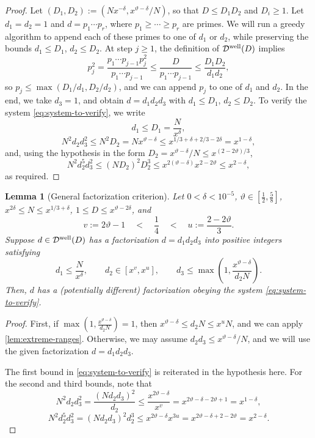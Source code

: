 \documentclass[reqno,11pt]{amsart}
\newtheorem{lemma}[theorem]{Lemma}
\theoremstyle{remark}
\numberwithin{equation}{section}
\newcommand{\mDw}{\mathcal{D}^{\textnormal{well}}}
\begin{document}
\begin{proof}
Let $(D_1, D_2) := (N x^{-\delta}, x^{\vartheta-\delta}/N)$, so that $D \le D_1 D_2$ and $D_i \ge 1$. Let $d_1 = d_2 = 1$ and $d = p_1\cdots p_r$, where $p_1 \ge \cdots \ge p_r$ are primes. We will run a greedy algorithm to append each of these primes to one of $d_1$ or $d_2$, while preserving the bounds $d_1 \le D_1$, $d_2 \le D_2$. At step $j \ge 1$, the definition of $\mDw(D)$ implies
\[
    p_j^2 = \frac{p_1\cdots p_{j-1} p_j^2}{p_1\cdots p_{j-1}} \le \frac{D}{p_1 \cdots p_{j-1}} \le \frac{D_1 D_2}{d_1 d_2},
\]
so $p_j \le \max(D_1/d_1, D_2/d_2)$, and we can append $p_j$ to one of $d_1$ and $d_2$. In the end, we take $d_3 = 1$, and obtain $d = d_1d_2d_3$ with $d_1 \le D_1$, $d_2 \le D_2$. To verify the system \cref{eq:system-to-verify}, we write
\[
    d_1 \le D_1 = \frac{N}{x^\delta},
\]
\[
    N^2 d_2 d_3^2 \le N^2 D_2 = N x^{\vartheta-\delta} \le x^{1/3+\delta+2/3-2\delta} = x^{1-\delta},
\]
and, using the hypothesis in the form $D_2 = x^{\vartheta-\delta}/N \le x^{(2-2\vartheta)/3}$,
\[
    N^2 d_2^5 d_3^2 \le (ND_2)^2 D_2^3 \le x^{2(\vartheta-\delta)} x^{2-2\vartheta} \le x^{2-\delta},
\]
as required.
\end{proof}

\begin{lemma}[General factorization criterion] \label{lem:general-factorization}
Let $0 < \delta < 10^{-5}$, $\vartheta \in [\tfrac{1}{2}, \tfrac{5}{8}]$, $x^{2\delta} \le N \le x^{1/3+\delta}$, $1 \le D \le x^{\vartheta-2\delta}$, and  
\begin{equation} \label{eq:u-v-choice}
    v := 2\vartheta - 1 \quad<\quad \frac{1}{4} \quad<\quad u := \frac{2-2\vartheta}{3}.
\end{equation}
Suppose $d \in \mDw(D)$ has a factorization $d = d_1d_2d_3$ into positive integers satisfying
\[
    d_1 \le \frac{N}{x^\delta}, \qquad 
    d_2 \in [x^v, x^u], \qquad 
    d_3 \le \max\left(1, \frac{x^{\vartheta-\delta}}{d_2N}\right).
\]
Then, $d$ has a (potentially different) factorization obeying the system \cref{eq:system-to-verify}.
\end{lemma}

\begin{proof}
First, if $\max(1, \frac{x^{\vartheta-\delta}}{d_2N}) = 1$, then $x^{\vartheta-\delta} \le d_2 N \le x^u N$, and we can apply \cref{lem:extreme-ranges}. Otherwise, we may assume $d_2d_3 \le x^{\vartheta-\delta}/N$, and we will use the given factorization $d = d_1d_2d_3$.

The first bound in \cref{eq:system-to-verify} is reiterated in the hypothesis here. For the second and third bounds, note that
\[
    N^2 d_2 d_3^2 = \frac{(Nd_2 d_3)^2}{d_2} \le \frac{x^{2\vartheta-\delta}}{x^v} = x^{2\vartheta - \delta - 2\vartheta+1} = x^{1-\delta},
\]
\[
    N^2 d_2^5 d_3^2 = (Nd_2d_3)^2 d_2^3 \le x^{2\vartheta-\delta} x^{3u} = x^{2\vartheta - \delta + 2-2\vartheta} = x^{2-\delta}.
\]
\end{proof}
\end{document}

